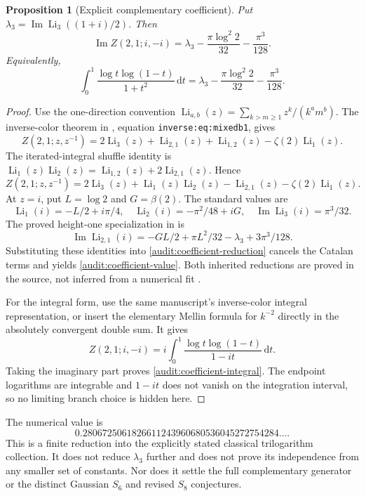 \documentclass[11pt]{article}
\newtheorem{proposition}[theorem]{Proposition}
\theoremstyle{definition}
\theoremstyle{remark}
\numberwithin{equation}{section}
\newcommand{\dd}{\,\mathrm d}
\newcommand{\Li}{\operatorname{Li}}
\newcommand{\Imag}{\operatorname{Im}}
\begin{document}
\begin{proposition}[Explicit complementary coefficient]\label{audit:coefficient}
Put $\lambda_3=\Imag\Li_3((1+i)/2)$. Then
\begin{equation}\label{audit:coefficient-value}
 \boxed{\displaystyle
 \Imag Z(2,1;i,-i)
   =\lambda_3-\frac{\pi\log^2 2}{32}-\frac{\pi^3}{128}.}
\end{equation}
Equivalently,
\begin{equation}\label{audit:coefficient-integral}
 \int_0^1\frac{\log t\log(1-t)}{1+t^2}\dd t
 =\lambda_3-\frac{\pi\log^2 2}{32}-\frac{\pi^3}{128}.
\end{equation}
\end{proposition}
\begin{proof}
Use the one-direction convention
$\Li_{a,b}(z)=\sum_{k>m\ge1}z^k/(k^a m^b)$.
The inverse-color theorem in
, equation
\texttt{inverse:eq:mixedb1}, gives
\[
 Z(2,1;z,z^{-1})
 =2\Li_3(z)+\Li_{2,1}(z)+\Li_{1,2}(z)-\zeta(2)\Li_1(z).
\]
The iterated-integral shuffle identity is
$\Li_1(z)\Li_2(z)=\Li_{1,2}(z)+2\Li_{2,1}(z)$.
Hence
\begin{equation}\label{audit:coefficient-reduction}
 Z(2,1;z,z^{-1})
 =2\Li_3(z)+\Li_1(z)\Li_2(z)-\Li_{2,1}(z)-\zeta(2)\Li_1(z).
\end{equation}
At $z=i$, put $L=\log2$ and $G=\beta(2)$. The standard values are
\[
 \Li_1(i)=-L/2+i\pi/4,\quad
 \Li_2(i)=-\pi^2/48+iG,\quad
 \Imag\Li_3(i)=\pi^3/32.
\]
The proved height-one specialization in
 is
\[
 \Imag\Li_{2,1}(i)
 =-GL/2+\pi L^2/32-\lambda_3+3\pi^3/128.
\]
Substituting these identities into
\eqref{audit:coefficient-reduction} cancels the Catalan terms and yields
\eqref{audit:coefficient-value}. Both inherited reductions are proved in
the source, not inferred from a numerical fit \cite{ProveItPin}.

For the integral form, use the same manuscript's inverse-color integral
representation, or insert the elementary Mellin formula for $k^{-2}$
directly in the absolutely convergent double sum. It gives
\[
 Z(2,1;i,-i)
 =i\int_0^1\frac{\log t\log(1-t)}{1-it}\dd t.
\]
Taking the imaginary part proves \eqref{audit:coefficient-integral}.
The endpoint logarithms are integrable and $1-it$ does not vanish on the
integration interval, so no limiting branch choice is hidden here.
\end{proof}

The numerical value is
\[
 0.2806725061826611243960680536045272754284\ldots.
\]
This is a finite reduction into the explicitly stated classical
trilogarithm collection. It does not reduce $\lambda_3$ further and does
not prove its independence from any smaller set of constants. Nor does
it settle the full complementary generator or the distinct Gaussian
$S_6$ and revised $S_8$ conjectures.
\end{document}
